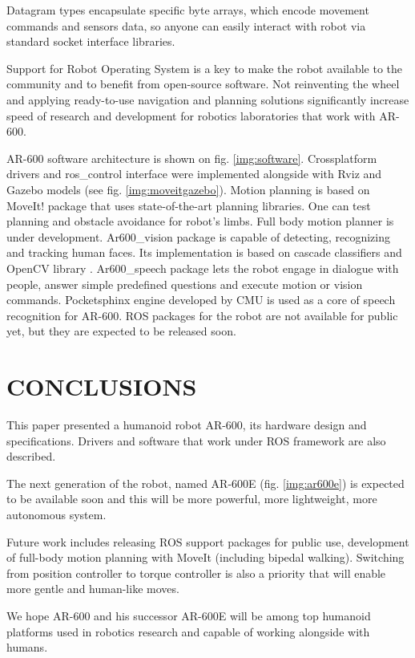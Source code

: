\documentclass[letterpaper, 10 pt, conference]{ieeeconf}  %
\begin{document}
Datagram types encapsulate specific byte arrays, which encode movement
commands and sensors data, so anyone can easily interact with robot via standard
socket interface libraries.

Support for Robot Operating System \cite{c2} is a key to make the robot
available to the community and to benefit from open-source software. Not
reinventing the wheel and applying ready-to-use navigation and planning
solutions significantly increase speed of research and development for robotics
laboratories that work with AR-600.

AR-600 software architecture is shown on fig. \ref{img:software}. Crossplatform
drivers and ros\_control interface were implemented alongside with Rviz and
Gazebo models (see fig. \ref{img:moveitgazebo}). Motion planning is based on MoveIt! package \cite{c3} that uses state-of-the-art planning libraries. One can test planning
and obstacle avoidance for robot's limbs. Full body motion planner is under
development. Ar600\_vision package is capable of detecting, recognizing and
tracking human faces. Its implementation is based on cascade classifiers and
OpenCV library \cite{c4}. Ar600\_speech package lets the robot engage in
dialogue with people, answer simple predefined questions and execute motion or vision
commands. Pocketsphinx engine \cite{c5} developed by CMU is used as a core of
speech recognition for AR-600. ROS packages for the robot are not available for
public yet, but they are expected to be released soon.

\section{CONCLUSIONS}

This paper presented a humanoid robot AR-600, its hardware design and
specifications. Drivers and software that work under ROS framework are
also described.

The next generation of the robot, named AR-600E (fig. \ref{img:ar600e}) is
expected to be available soon and this will be more powerful, more lightweight,
more autonomous system.

Future work includes releasing ROS support packages for public use, development
of full-body motion planning with MoveIt (including bipedal walking). Switching
from position controller to torque controller is also a priority that
will enable more gentle and human-like moves. 

We hope AR-600 and his successor AR-600E will be among top humanoid platforms
used in robotics research and capable of working alongside with humans.
\end{document}

